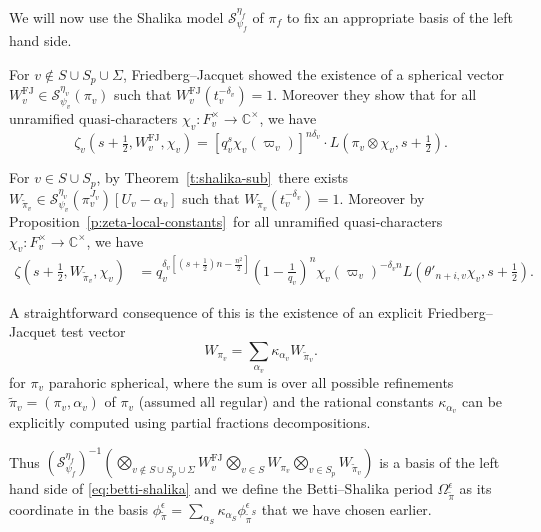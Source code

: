 \documentclass{amsart}
\theoremstyle{definition}
\newcommand{\C}{\mathbb{C}}
\begin{document}
{We will now use the Shalika model $\mathcal{S}_{\psi_f}^{\eta_f}$ of $\pi_f$ to fix an appropriate  basis of the left hand side. 

For $v\notin S\cup S_p\cup \Sigma$, Friedberg--Jacquet \cite{friedberg-jacquet} showed the existence of a  spherical vector $W^{\mathrm{FJ}}_v \in \mathcal{S}_{\psi_v}^{\eta_v}(\pi_v)$  such that $W^{\mathrm{FJ}}_v(t_v^{-\delta_v})=1$. Moreover they show that 
for all unramified quasi-characters $\chi_v : F_v^\times \to \C^\times$, we have
\begin{equation}\label{eq:jacquet-friedberg test vector}
	\zeta_v\left(s+\tfrac{1}{2}, W^{\mathrm{FJ}}_v, \chi_v\right) = [q_v^s\chi_v(\varpi_v)]^{n\delta_v}\cdot L\left(\pi_v \otimes \chi_v,s+\tfrac{1}{2}\right). 
\end{equation}

For $v\in S\cup S_p$, by Theorem~\ref{t:shalika-sub} there exists $W_{\widetilde\pi_v}\in \mathcal{S}_{\psi_v}^{\eta_v}(\pi_v^{J_v})[ U_v-\alpha_v]$ such that  $W_{\widetilde\pi_v}(t_v^{-\delta_v})=1$. Moreover by 	 Proposition~\ref{p:zeta-local-constants} for all unramified quasi-characters $\chi_v : F_v^\times \to \C^\times$,
 we have
 \begin{align*}
\zeta(s+\tfrac{1}{2},W_{\widetilde\pi_v},\chi_v)&=q_v^{\delta_v \left[(s+\frac{1}{2})n-\frac{n^2}{2}\right]}\left(1-\frac{1}{q_v}\right)^n\chi_v(\varpi_v)^{-\delta_v n}L(\theta'_{n+i,v}\chi_v,s+\tfrac{1}{2}).
\end{align*}

A straightforward consequence of this  is the existence of an explicit  Friedberg--Jacquet test vector
\[W_{\pi_v}=\sum\limits_{\alpha_v} \kappa_{\alpha_v} W_{\widetilde\pi_v}.\]
for $\pi_v$ parahoric spherical, where the sum is over all possible refinements $\widetilde\pi_v=(\pi_v,\alpha_v)$ of $\pi_v$ (assumed all regular) and 
the rational constants $\kappa_{\alpha_v}$ can be explicitly computed using partial fractions decompositions.

Thus  $\left(\mathcal{S}_{\psi_f}^{\eta_f}\right)^{-1}\left(\bigotimes_{v\notin S\cup S_p\cup \Sigma} W^{\mathrm{FJ}}_v 
\bigotimes_{v\in  S} W_{\pi_v} \bigotimes_{v\in  S_p} W_{\widetilde\pi_v}\right)$ is a   basis of the left hand side of \eqref{eq:betti-shalika} and we define the Betti--Shalika period
$\Omega_{\widetilde\pi}^\epsilon$ as its coordinate in the basis $\phi_{\widetilde\pi}^\epsilon=
\sum\limits_{\alpha_S} \kappa_{\alpha_S} \phi_{\widetilde\pi^S}^\epsilon$ that we have  chosen earlier. 
	
}
\end{document}
